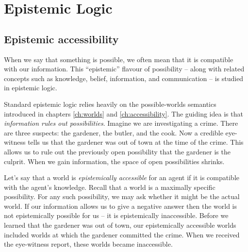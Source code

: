 \chapter{Epistemic Logic}\label{ch:epistemic}


%
%
%

\section{Epistemic accessibility}

When we say that something is possible, we often mean that it is compatible with
our information. This ``epistemic'' flavour of possibility -- along with related
concepts such as knowledge, belief, information, and communication -- is studied
in epistemic logic.

Standard epistemic logic relies heavily on the possible-worlds semantics
introduced in chapters \ref{ch:worlds} and \ref{ch:accessibility}. The guiding
idea is that \emph{information rules out possibilities}. Imagine we are
investigating a crime. There are three suspects: the gardener, the butler, and
the cook. Now a credible eye-witness tells us that the gardener was out of town at
the time of the crime. This allows us to rule out the previously open
possibility that the gardener is the culprit. When we gain information, the
space of open possibilities shrinks.


Let's say that a world is \emph{epistemically accessible} for an agent if it is
compatible with the agent's knowledge. Recall that a world is a maximally
specific possibility. For any such possibility, we may ask whether it might be
the actual world. If our information allows us to give a negative answer then
the world is not epistemically possible for us -- it is epistemically
inaccessible. Before we learned that the gardener was out of town, our
epistemically accessible worlds included worlds at which the gardener committed
the crime. When we received the eye-witness report, these worlds became
inaccessible.

